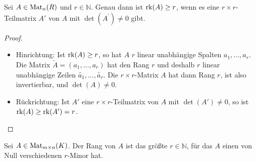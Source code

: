 \begin{proposition}
	Sei $A\in \operatorname{Mat}_n(R)$ und $r\in \mathbb N$. Genau dann ist $\operatorname{rk}(A)\ge r$, wenn es eine $r\times r$-
	Teilmatrix $A'$ von $A$ mit $\det(A^{\prime})\neq 0$ gibt.
\end{proposition}
\begin{proof}
	\begin{itemize}
		\item Hinrichtung: Ist $\operatorname{rk}(A)\ge r$, so hat $A$ $r$ linear unabhängige Spalten $a_1,...,a_r$. Die Matrix $\tilde A=(a_1,...,a_r)$ 
		hat den Rang $r$ und deshalb $r$ linear unabhängige Zeilen $\widetilde{a_1},...,\widetilde{a_r}$. Die $r\times r$-Matrix $A$ hat 
		dann Rang $r$, ist also invertierbar, und $\det(A)\neq 0$.
		\item Rückrichtung: Ist $A'$ eine $r\times r$-Teilmatrix von $A$ mit $\det(A')\neq 0$, so ist $\operatorname{rk}(A)\ge \operatorname{rk}(A')=r$.
	\end{itemize}
\end{proof}

\begin{conclusion}
	Sei $A\in \operatorname{Mat}_{m\times n}(K)$. Der Rang von $A$ ist das größte $r\in \mathbb N$, für das 
	$A$ einen von Null verschiedenen $r$-Minor hat.
\end{conclusion}